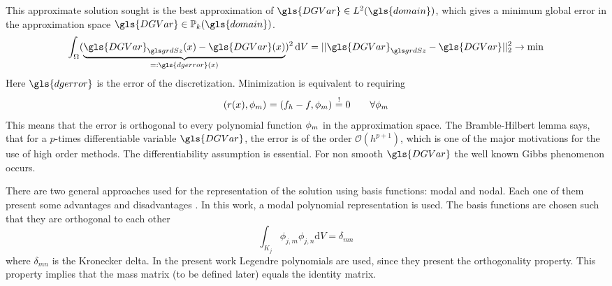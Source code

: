 This approximate solution sought  is the best approximation of $\gls{DGVar} \in L^2(\gls{domain})$, which gives a minimum global error in the approximation space $\gls{DGVar} \in \mathbb{P}_k(\gls{domain} )$. 
\begin{align}
	\int_{\domain} (\underbrace{ \nuM{\gls{DGVar}}(x)-\gls{DGVar}(x) }_{=: \gls{dgerror}(x)})^2 \dV
	= ||\nuM{\gls{DGVar}} - \gls{DGVar}||_2^2 \rightarrow \text{min}
\end{align}
Here $\gls{dgerror}$ is the error of the discretization. Minimization is equivalent to requiring
\begin{equation}
	\label{eq:L2projection}
	\left( r(x) , \phi{}_m \right)_{} = \left( f_h-f , \phi{}_m \right)_{} \stackrel{!}{=} 0 \qquad \forall\phi{}_m
\end{equation}
This means that the error is orthogonal to every polynomial function $ \phi{}_m$ in the approximation space. The Bramble-Hilbert lemma \parencite{brambleEstimationLinearFunctionals1970} says, that for a $p$-times differentiable variable $\gls{DGVar}$, the error is of the order $\mathcal{O}(h^{p+1})$, which is one of the major motivations for the use of high order methods. The differentiability assumption is essential. For non smooth $\gls{DGVar}$ the well known Gibbs phenomenon occurs.

There are two general approaches used for the representation of the solution using basis functions: modal and nodal. Each one of them present some advantages and disadvantages \parencite{hesthavenNodalDiscontinuousGalerkin2008}. In this work, a modal polynomial representation is used. The basis functions are chosen such that they are orthogonal to each other 
\begin{equation}
	\int_{K_j} \phi_{j,m}\phi_{j,n} \text{d}V= \delta_{mn}
\end{equation}
where $\delta_{mn}$ is the Kronecker delta. In the present work Legendre polynomials are used, since they present the orthogonality property. This property implies that the mass matrix (to be defined later) equals the identity matrix.

